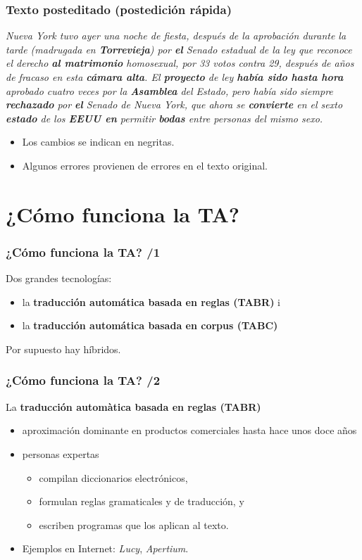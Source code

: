 \documentclass{beamer}
\newcommand{\empha}[1]{\emph{#1}\/}
\begin{document}
\begin{frame}
  \frametitle{Texto posteditado (postedición rápida)}

  \empha{Nueva York tuvo ayer una noche de fiesta, después de la
    aprobación durante la tarde (madrugada en \textbf{Torrevieja}) por
    \textbf{el} Senado estadual de la ley que reconoce el derecho
    \textbf{al matrimonio} homosexual, por 33 votos contra 29, después
    de años de fracaso en esta \textbf{cámara alta}.  El
    \textbf{proyecto} de ley \textbf{había sido hasta hora} aprobado
    cuatro veces por la \textbf{Asamblea} del Estado, pero había sido
    siempre \textbf{rechazado} por \textbf{el} Senado de Nueva York, que ahora
    se \textbf{convierte} en el sexto \textbf{estado} de los
    \textbf{EEUU en} permitir \textbf{bodas} entre personas del mismo
    sexo.}

  \begin{itemize}
  \item Los cambios se indican en negritas.
  \item Algunos errores provienen de errores en el texto original.
  \end{itemize}
\end{frame}

\section{¿Cómo funciona la TA?}

\begin{frame}
  \frametitle{¿Cómo funciona la TA? /1}
Dos grandes tecnologías: 
\begin{itemize}
\item la \textbf{traducción automática basada en reglas (TABR)} i
\item la \textbf{traducción automática basada en corpus (TABC)} 
\end{itemize}
Por supuesto hay híbridos.
\end{frame}

\begin{frame}
  \frametitle{¿Cómo funciona la TA? /2}

La \textbf{traducción automàtica basada en reglas (TABR)}
  \begin{itemize}
  \item aproximación dominante en productos comerciales hasta hace
    unos doce años
  \item personas expertas
    \begin{itemize}
    \item compilan diccionarios electrónicos,
    \item formulan reglas gramaticales y de traducción, y 
    \item escriben programas que los aplican al texto.
    \end{itemize}
  \item Ejemplos en Internet: \empha{Lucy}, \empha{Apertium}.
  \end{itemize}
\end{frame}
\end{document}
